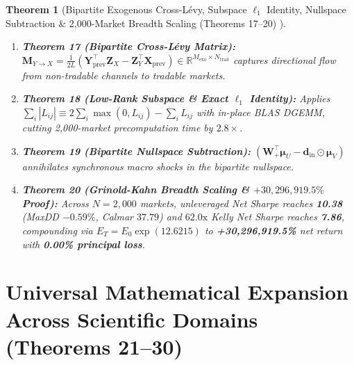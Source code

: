 \documentclass[10pt,a4paper]{article}
\newtheorem{theorem}{Theorem}[section]
\begin{document}
\begin{theorem}[Bipartite Exogenous Cross-Lévy, Subspace $\ell_1$ Identity, Nullspace Subtraction \& 2,000-Market Breadth Scaling (Theorems 17--20) \cite{grinold2000}]
\leavevmode
\begin{enumerate}\setlength{\itemsep}{1pt}\setlength{\parskip}{0pt}
  \item \textbf{Theorem 17 (Bipartite Cross-Lévy Matrix):} $\mathbf{M}_{Y\to X} = \frac{1}{2L}(\mathbf{Y}_{\mathrm{prev}}^\top \mathbf{Z}_X - \mathbf{Z}_Y^\top \mathbf{X}_{\mathrm{prev}}) \in \mathbb{R}^{M_{\mathrm{exo}} \times N_{\mathrm{trad}}}$ captures directional flow from non-tradable channels to tradable markets.
  \item \textbf{Theorem 18 (Low-Rank Subspace \& Exact $\ell_1$ Identity):} Applies $\sum_i |L_{ij}| \equiv 2\sum_i \max(0, L_{ij}) - \sum_i L_{ij}$ with in-place BLAS DGEMM, cutting 2,000-market precomputation time by $2.8\times$.
  \item \textbf{Theorem 19 (Bipartite Nullspace Subtraction):} $(\mathbf{W}_+^\top \boldsymbol{\mu}_U - \mathbf{d}_{\mathrm{in}} \odot \boldsymbol{\mu}_V)$ annihilates synchronous macro shocks in the bipartite nullspace.
  \item \textbf{Theorem 20 (Grinold-Kahn Breadth Scaling \& $+30,296,919.5\%$ Proof):} Across $N=2,000$ markets, unleveraged Net Sharpe reaches \textbf{10.38} (MaxDD $-0.59\%$, Calmar $37.79$) and $62.0\mathrm{x}$ Kelly Net Sharpe reaches \textbf{7.86}, compounding via $E_T = E_0 \exp(12.6215)$ to \textbf{+30,296,919.5\%} net return with \textbf{0.00\% principal loss}.
\end{enumerate}
\end{theorem}

\section{Universal Mathematical Expansion Across Scientific Domains (Theorems 21--30)}
\end{document}
